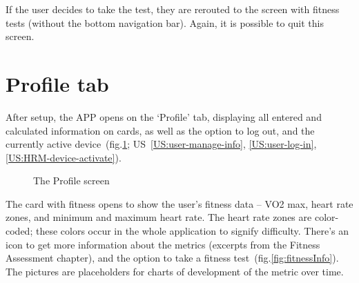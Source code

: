 If the user decides to take the test, they are rerouted to the screen with fitness tests (without the bottom navigation bar).
Again, it is possible to quit this screen.

\section{Profile tab}
After setup, the APP opens on the `Profile' tab, displaying all entered and calculated information on cards, as well as the option to log out, and the currently active device~(fig.\ref{fig:profile1}; US~\ref{US:user-manage-info}, \ref{US:user-log-in}, \ref{US:HRM-device-activate}).

\begin{figure}[h!]
    \centering
    \hfill
    \caption{The Profile screen}
    \label{fig:profile1}
\end{figure}

The card with fitness opens to show the user's fitness data -- VO2 max, heart rate zones, and minimum and maximum heart rate.
The heart rate zones are color-coded; these colors occur in the whole application to signify difficulty.
There's an icon to get more information about the metrics (excerpts from the Fitness Assessment chapter), and the option to take a fitness test~(fig.\ref{fig:fitnessInfo}).
The pictures are placeholders for charts of development of the metric over time.

